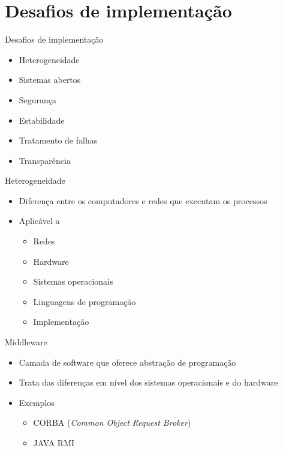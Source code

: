 \documentclass[aspectratio=169,
				xcolor=table]{beamer}
\begin{document}
	\section{Desafios de implementação}
	\begin{frame}{Desafios de implementação}
		\begin{itemize}
			\item Heterogeneidade
			\vspace{1em}
			\item Sistemas abertos
			\vspace{1em}
			\item Segurança
			\vspace{1em}
			\item Estabilidade
			\vspace{1em}
			\item Tratamento de falhas
			\vspace{1em}
			\item Transparência
		\end{itemize}
	\end{frame}

	\begin{frame}{Heterogeneidade}
		\begin{itemize}
			\item Diferença entre os computadores e redes que executam os processos
			\vspace{1em}
			\item Aplicável a
			\begin{itemize}
				\item Redes
				\item Hardware
				\item Sistemas operacionais
				\item Linguagens de programação
				\item Implementação
			\end{itemize}
		\end{itemize}
	\end{frame}

	\begin{frame}{Middleware}
		\begin{itemize}
			\item Camada de software que oferece abstração de programação
			\vspace{1em}
			\item Trata das diferenças em nível dos sistemas operacionais e do hardware 
			\vspace{1em}
			\item Exemplos
			\begin{itemize}
				\item CORBA (\textit{Common Object Request Broker})
				\item JAVA RMI
			\end{itemize}
		\end{itemize}
	\end{frame}
	
\end{document}
